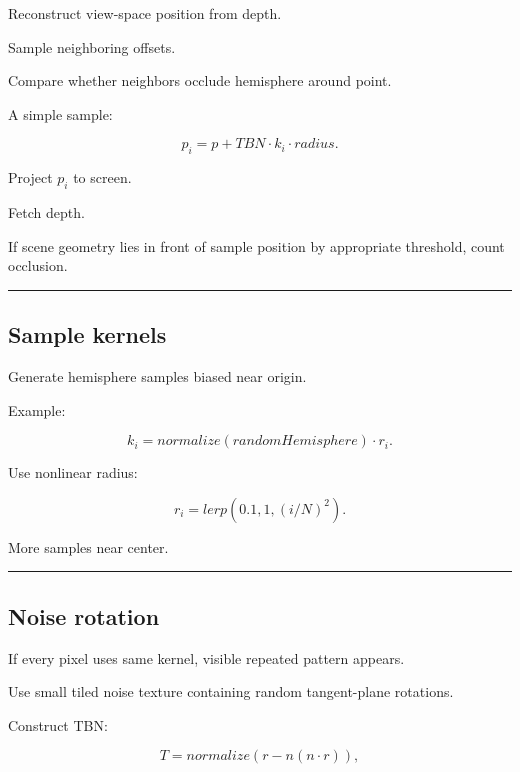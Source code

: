 \hypertarget{04-visual-computing-ii-ch040-ssao}{}

Reconstruct view-space position from depth.

Sample neighboring offsets.

Compare whether neighbors occlude hemisphere around point.

A simple sample:

\[
p_i=
p+
TBN\cdot k_i\cdot radius.
\]

Project \(p_i\) to screen.

Fetch depth.

If scene geometry lies in front of sample position by appropriate threshold, count occlusion.

\begin{center}\rule{0.5\linewidth}{0.5pt}\end{center}

\subsection{Sample kernels}\label{04-visual-computing-ii-ch040-sample-kernels}

\hypertarget{04-visual-computing-ii-ch040-sample-kernels}{}

Generate hemisphere samples biased near origin.

Example:

\[
k_i=
normalize(randomHemisphere)
\cdot r_i.
\]

Use nonlinear radius:

\[
r_i=
lerp(
0.1,
1,
(i/N)^2
).
\]

More samples near center.

\begin{center}\rule{0.5\linewidth}{0.5pt}\end{center}

\subsection{Noise rotation}\label{04-visual-computing-ii-ch040-noise-rotation}

\hypertarget{04-visual-computing-ii-ch040-noise-rotation}{}

If every pixel uses same kernel, visible repeated pattern appears.

Use small tiled noise texture containing random tangent-plane rotations.

Construct TBN:

\[
T=
normalize(
r-n(n\cdot r)
),
\]


